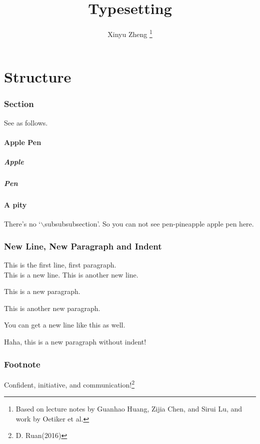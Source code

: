 \documentclass[12pt]{article}
\author{Xinyu Zheng \thanks{Based on lecture notes by Guanhao Huang, Zijia Chen, and Sirui Lu, and work by Oetiker et{} al.}}
\title{Typesetting}
\begin{document}
\maketitle
\newpage

\tableofcontents
\newpage

\part{Structure}

\section{Section}
See as follows.
\subsection{Apple Pen}
\subsubsection{Apple}
\subsubsection{Pen}
\subsection*{A pity}
There's no `$\backslash$subsubsubsection'. So you can not see pen-pineapple apple pen here.

\section{New Line, New Paragraph and Indent}
This is the first line, first paragraph.\\
This is a new line.\newline
\indent This is another new line.

This is a new paragraph.\par
This is another new paragraph.

You can get a new line like this as well.

\noindent Haha, this is a new paragraph without indent! 

\section{Footnote}
Confident, initiative, and communication!\footnote{D. Ruan(2016)}
\end{document}
